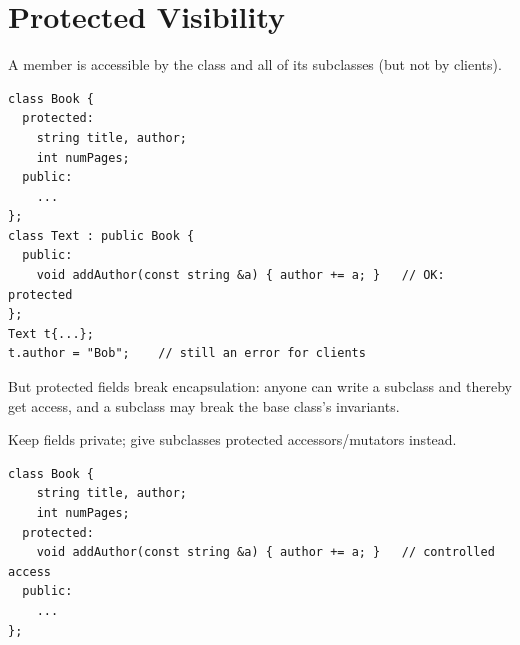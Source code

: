 \begin{center}
\end{center}

\section{Protected Visibility}
A  member is accessible by the class and all of its subclasses
(but not by clients).
\begin{lstlisting}[style=cpp]
class Book {
  protected:
    string title, author;
    int numPages;
  public:
    ...
};
class Text : public Book {
  public:
    void addAuthor(const string &a) { author += a; }   // OK: protected
};
Text t{...};
t.author = "Bob";    // still an error for clients
\end{lstlisting}
But protected fields break encapsulation: anyone can write a subclass and
thereby get access, and a subclass may break the base class's invariants.

\begin{important}[Advice]
Keep fields private; give subclasses protected accessors/mutators instead.
\end{important}
\begin{lstlisting}[style=cpp]
class Book {
    string title, author;
    int numPages;
  protected:
    void addAuthor(const string &a) { author += a; }   // controlled access
  public:
    ...
};
\end{lstlisting}

